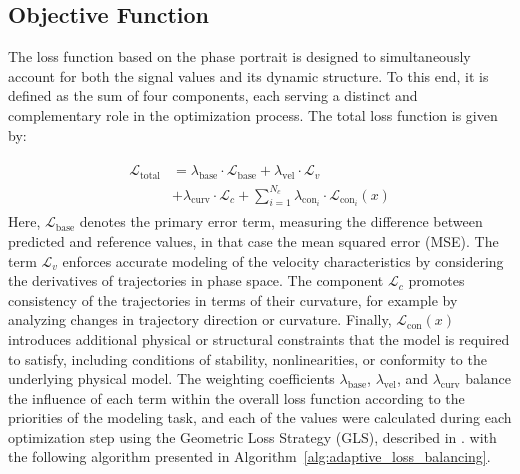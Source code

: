 \documentclass[lettersize,journal]{IEEEtran}
\begin{document}
\subsection{Objective Function}
\noindent The loss function based on the phase portrait is designed to simultaneously account for both the  signal values and its dynamic structure. To this end, it is defined as the sum of four components, each serving a distinct and complementary role in the optimization process. The total loss function is given by:

\begin{align}
  \begin{split}
    \mathcal{L}_{\mathrm{total}} & = \lambda_{\mathrm{base}} \cdot \mathcal{L}_{\mathrm{base}} + \lambda_{\mathrm{vel}} \cdot \mathcal{L}_{v} \\ &+ \lambda_{\mathrm{curv}} \cdot \mathcal{L}_{c} + \sum^{N_c}_{i=1} \lambda_{\mathrm{con}_i} \cdot \mathcal{L}_{\mathrm{con}_i}(x)
    \label{eq:loss_function}
  \end{split}
\end{align}
Here, \(\mathcal{L}_{\mathrm{base}}\) denotes the primary error term,  measuring the difference between predicted and reference values, in that case the mean squared error (MSE). The term \(\mathcal{L}_{v}\) enforces accurate modeling of the velocity characteristics by considering the derivatives of trajectories in phase space. The component \(\mathcal{L}_{c}\) promotes consistency of the trajectories in terms of their curvature, for example by analyzing changes in trajectory direction or curvature. Finally, \(\mathcal{L}_{\mathrm{con}}(x)\) introduces additional physical or structural constraints that the model is required to satisfy, including conditions of stability, nonlinearities, or conformity to the underlying physical model. The weighting coefficients \(\lambda_{\mathrm{base}}\), \(\lambda_{\mathrm{vel}}\),  and \(\lambda_{\mathrm{curv}}\) balance the influence of each term within the overall loss function according to the priorities of the modeling task, and each of the values were calculated during each optimization step using the Geometric Loss Strategy (GLS), described in \cite{Cipolla2018, Chen2018}. with the following algorithm presented in Algorithm~\ref{alg:adaptive_loss_balancing}.
\end{document}
